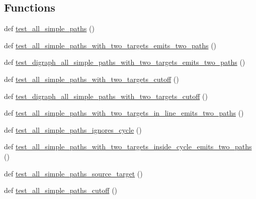\subsection*{Functions}
\begin{DoxyCompactItemize}
\item 
def \hyperlink{namespacenetworkx_1_1algorithms_1_1tests_1_1test__simple__paths_afc29ed3107dca1e8929ddc986f0e9de9}{test\+\_\+all\+\_\+simple\+\_\+paths} ()
\item 
def \hyperlink{namespacenetworkx_1_1algorithms_1_1tests_1_1test__simple__paths_aec955e99e778b163db7649ca11ed3aa0}{test\+\_\+all\+\_\+simple\+\_\+paths\+\_\+with\+\_\+two\+\_\+targets\+\_\+emits\+\_\+two\+\_\+paths} ()
\item 
def \hyperlink{namespacenetworkx_1_1algorithms_1_1tests_1_1test__simple__paths_a5431d50f4ab7235394054caf1f44274c}{test\+\_\+digraph\+\_\+all\+\_\+simple\+\_\+paths\+\_\+with\+\_\+two\+\_\+targets\+\_\+emits\+\_\+two\+\_\+paths} ()
\item 
def \hyperlink{namespacenetworkx_1_1algorithms_1_1tests_1_1test__simple__paths_ae40db4e046eeb639ccffbd5ead98fa1d}{test\+\_\+all\+\_\+simple\+\_\+paths\+\_\+with\+\_\+two\+\_\+targets\+\_\+cutoff} ()
\item 
def \hyperlink{namespacenetworkx_1_1algorithms_1_1tests_1_1test__simple__paths_aad32d0a8f510bd40e9f0df28abb5eb52}{test\+\_\+digraph\+\_\+all\+\_\+simple\+\_\+paths\+\_\+with\+\_\+two\+\_\+targets\+\_\+cutoff} ()
\item 
def \hyperlink{namespacenetworkx_1_1algorithms_1_1tests_1_1test__simple__paths_af51171d26165d7713d7e2657c9136f3d}{test\+\_\+all\+\_\+simple\+\_\+paths\+\_\+with\+\_\+two\+\_\+targets\+\_\+in\+\_\+line\+\_\+emits\+\_\+two\+\_\+paths} ()
\item 
def \hyperlink{namespacenetworkx_1_1algorithms_1_1tests_1_1test__simple__paths_aa8bfb27e1174c1aa4344896e5bf83501}{test\+\_\+all\+\_\+simple\+\_\+paths\+\_\+ignores\+\_\+cycle} ()
\item 
def \hyperlink{namespacenetworkx_1_1algorithms_1_1tests_1_1test__simple__paths_ad164e09f52341b53332a24601c0fead5}{test\+\_\+all\+\_\+simple\+\_\+paths\+\_\+with\+\_\+two\+\_\+targets\+\_\+inside\+\_\+cycle\+\_\+emits\+\_\+two\+\_\+paths} ()
\item 
def \hyperlink{namespacenetworkx_1_1algorithms_1_1tests_1_1test__simple__paths_ac3074451277091e3c7635d1229d2a5d8}{test\+\_\+all\+\_\+simple\+\_\+paths\+\_\+source\+\_\+target} ()
\item 
def \hyperlink{namespacenetworkx_1_1algorithms_1_1tests_1_1test__simple__paths_abde27fd542a57fdb68bfd6a578700f98}{test\+\_\+all\+\_\+simple\+\_\+paths\+\_\+cutoff} ()

\end{DoxyCompactItemize}
